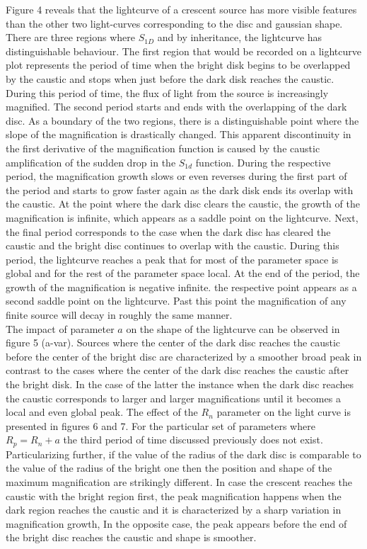 \documentclass[usenatbib]{mn2e}
\begin{document}
Figure 4 reveals that the lightcurve of a crescent source has more visible features than the other two light-curves
corresponding to the disc and gaussian shape. There are three regions where $S_{1D}$ and by inheritance, the lightcurve
 has distinguishable behaviour. The first region that would be recorded on a lightcurve plot represents the period
of time when the bright disk begins to be overlapped by the caustic and stops when just before the dark disk reaches
the caustic. During this period of time, the flux of light from the source is increasingly magnified. The second
period starts and ends with the overlapping of the dark disc. As a boundary of the two regions, there is a
distinguishable point where the slope of the magnification is drastically changed. This apparent discontinuity in the
first derivative of the magnification function is caused by the caustic amplification of the sudden drop in the $S_{1d}$
function. During the respective period, the magnification growth slows or even reverses during the first part of the
period and starts to grow faster again as the dark disk ends its overlap with the caustic. At the point where
the dark disc clears the caustic, the growth of the magnification is infinite, which appears as a saddle point
on the lightcurve. Next, the final period corresponds to the case when the dark disc has cleared the caustic
and the bright disc continues to overlap with the caustic. During this period, the lightcurve reaches a peak
that for most of the parameter space is global and for the rest of the parameter space local.
At the end of the period, the growth of the magnification is negative infinite. the respective point appears 
as a second saddle point on the lightcurve. Past this point the magnification of any finite source will 
decay in roughly the same manner. \\

The impact of parameter $a$ on the shape of the lightcurve can be observed in figure 5 (a-var). Sources where 
the center of the dark disc reaches the caustic before the center of the bright disc are characterized by a smoother
broad peak in contrast to the cases where the center of the dark disc reaches the caustic after the bright disk.
In the case of the latter the instance when the dark disc reaches the caustic corresponds to larger and
larger magnifications until it becomes a local and even global peak. The effect of the $R_n$  parameter on the
light curve is presented in figures 6 and 7. For the particular set of parameters where $R_p = R_n +a$ the third
period of time discussed previously does not exist. Particularizing further, if the value of the radius of the dark
disc is comparable to the value of the radius of the bright one then the position and shape of the maximum magnification
 are strikingly different. In case the crescent reaches the caustic with the bright region first, the peak magnification
 happens when the dark region reaches the caustic and it is characterized by a sharp variation in magnification growth,
In the opposite case, the peak appears before the end of the bright disc reaches the caustic and shape is smoother. \\
\end{document}
